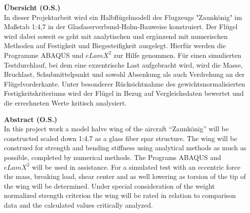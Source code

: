 \large{\textbf{Übersicht (O.S.)}}~\\
In dieser Projektarbeit wird ein Halbflügelmodell des Flugzeugs "Zaunkönig" im Maßstab 1:4,7 in der Glasfaserverbund-Holm-Bauweise konstruiert. Der Flügel wird dabei soweit es geht mit analytischen und ergänzend mit numerischen Methoden auf Festigkeit und Biegesteifigkeit ausgelegt. Hierfür werden die Programme ABAQUS und $ eLamX^{2} $ zur Hilfe genommen. Für einen simulierten Testdurchlauf, bei dem eine exzentrische Last aufgebracht wird, wird die Masse, Bruchlast, Schubmittelpunkt und sowohl Absenkung als auch Verdrehung an der Flügelvorderkante. Unter besonderer Rücksichtnahme des gewichtsnormalisierten Festigkeitskriteriums wird der Flügel in Bezug auf Vergleichsdaten bewertet und die errechneten Werte kritisch analysiert.
\newpage

\large{\textbf{Abstract (O.S.)}}~\\
In this project work a model halve wing of the aircraft “Zaunkönig” will be constructed scaled down 1:4.7 as a glass fiber spar structure. The wing will be construed for strength and bending stiffness using analytical methods as much as possible, completed by numerical methods. The Programs ABAQUS and $ eLamX^{2} $ will be used in assistance. For a simulated test with an eccentric force the mass, breaking load, shear center and as well lowering as torsion of the tip of the wing will be determined. Under special consideration of the weight normalized strength criterion the wing will be rated in relation to comparison data and the calculated values critically analyzed. 